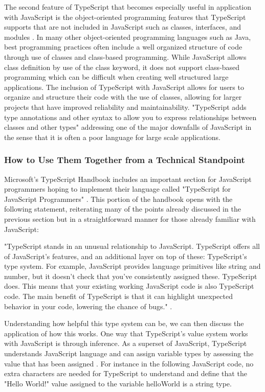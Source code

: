 \documentclass{article}
\theoremstyle{theorem}
\theoremstyle{definition}
\theoremstyle{remark}
\begin{document}
The second feature of TypeScript that becomes especially useful in application with JavaScript is the object-oriented programming features that TypeScript supports that are not included in JavaScript such as classes, interfaces, and modules \cite{11}. In many other object-oriented programming languages such as Java, best programming practices often include a well organized structure of code through use of classes and class-based programming. While JavaScript allows class definition by use of the class keyword, it does not support class-based programming which can be difficult when creating well structured large applications. The inclusion of TypeScript with JavaScript allows for users to organize and structure their code with the use of classes, allowing for larger projects that have improved reliability and maintainability. "TypeScript adds type annotations and other syntax to allow you to express relationships between classes and other types" \cite{11} addressing one of the major downfalls of JavaScript in the sense that it is often a poor language for large scale applications.

\subsubsection{How to Use Them Together from a Technical Standpoint}

Microsoft's TypeScript Handbook includes an important section for JavaScript programmers hoping to implement their language called "TypeScript for JavaScript Programmers" \cite{16}. This portion of the handbook opens with the following statement, reiterating many of the points already discussed in the previous section but in a straightforward manner for those already familiar with JavaScript:

"TypeScript stands in an unusual relationship to JavaScript. TypeScript offers all of JavaScript’s features, and an additional layer on top of these: TypeScript’s type system. For example, JavaScript provides language primitives like string and number, but it doesn’t check that you’ve consistently assigned these. TypeScript does. This means that your existing working JavaScript code is also TypeScript code. The main benefit of TypeScript is that it can highlight unexpected behavior in your code, lowering the chance of bugs." \cite{16}.

Understanding how helpful this type system can be, we can then discuss the application of how this works. One way that TypeScript's value system works with JavaScript is through inference. As a superset of JavaScript, TypeScript understands JavaScript language and can assign variable types by assessing the value that has been assigned \cite{16}. For instance in the following JavaScript code, no extra characters are needed for TypeScript to understand and define that the "Hello World!" value assigned to the variable helloWorld is a string type.
\end{document}
